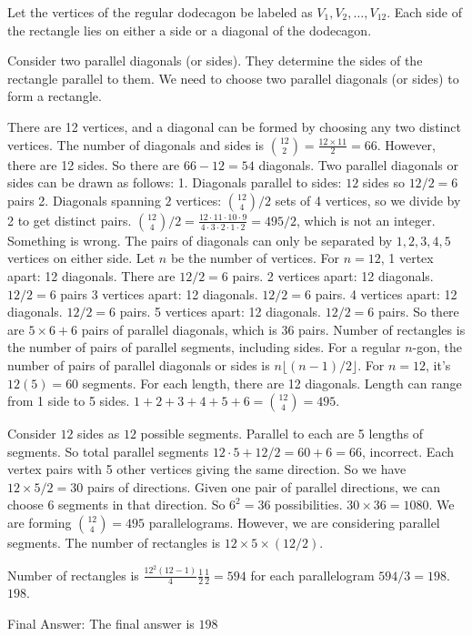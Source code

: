 \begin{tcolorbox}[title=Candidate Response, breakable]

Let the vertices of the regular dodecagon be labeled as $V_1, V_2, \dots, V_{12}$.
Each side of the rectangle lies on either a side or a diagonal of the dodecagon.

Consider two parallel diagonals (or sides). They determine the sides of the rectangle parallel to them.
We need to choose two parallel diagonals (or sides) to form a rectangle.

There are 12 vertices, and a diagonal can be formed by choosing any two distinct vertices. The number of diagonals and sides is $\binom{12}{2} = \frac{12 \times 11}{2} = 66$. However, there are 12 sides. So there are $66 - 12 = 54$ diagonals.
Two parallel diagonals or sides can be drawn as follows:
1. Diagonals parallel to sides: $12$ sides so $12/2 = 6$ pairs
2. Diagonals spanning $2$ vertices: $\binom{12}{4}/2$ sets of 4 vertices, so we divide by 2 to get distinct pairs. $\binom{12}{4}/2 = \frac{12 \cdot 11 \cdot 10 \cdot 9}{4 \cdot 3 \cdot 2 \cdot 1 \cdot 2} = 495/2$, which is not an integer. Something is wrong.
The pairs of diagonals can only be separated by $1,2,3,4,5$ vertices on either side. Let $n$ be the number of vertices. For $n=12$,
1 vertex apart: 12 diagonals. There are $12/2=6$ pairs.
2 vertices apart: 12 diagonals. $12/2 = 6$ pairs
3 vertices apart: 12 diagonals. $12/2=6$ pairs.
4 vertices apart: 12 diagonals. $12/2=6$ pairs.
5 vertices apart: 12 diagonals. $12/2=6$ pairs.
So there are $5 \times 6 + 6$ pairs of parallel diagonals, which is 36 pairs.
Number of rectangles is the number of pairs of parallel segments, including sides. For a regular $n$-gon, the number of pairs of parallel diagonals or sides is $n\lfloor (n-1)/2 \rfloor$. For $n=12$, it's $12(5) = 60$ segments. For each length, there are 12 diagonals. Length can range from 1 side to 5 sides. $1+2+3+4+5+6= \binom{12}{4} = 495$.

Consider $12$ sides as $12$ possible segments. Parallel to each are 5 lengths of segments. So total parallel segments $12 \cdot 5 + 12/2 = 60+6=66$, incorrect.
Each vertex pairs with 5 other vertices giving the same direction. So we have $12 \times 5 / 2 = 30$ pairs of directions.
Given one pair of parallel directions, we can choose $6$ segments in that direction. So $6^2 = 36$ possibilities. $30 \times 36 = 1080$.
We are forming $\binom{12}{4} = 495$ parallelograms. However, we are considering parallel segments.
The number of rectangles is $12 \times 5 \times (12/2)$.

Number of rectangles is $\frac{12^2(12-1)}{4} \frac{1}{2} \frac{1}{2} = 594$ for each parallelogram $594/3 = 198$. $\boxed{198}$.

Final Answer: The final answer is $\boxed{198}$


\end{tcolorbox}
